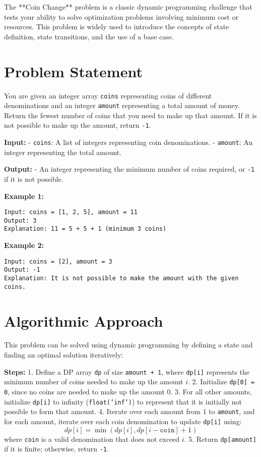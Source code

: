 
\label{problem:Coin_Change}

The **Coin Change** problem is a classic dynamic programming challenge that tests your ability to solve optimization problems involving minimum cost or resources. This problem is widely used to introduce the concepts of state definition, state transitions, and the use of a base case.

\section*{Problem Statement}
You are given an integer array \texttt{coins} representing coins of different denominations and an integer \texttt{amount} representing a total amount of money. Return the fewest number of coins that you need to make up that amount. If it is not possible to make up the amount, return \texttt{-1}.

\textbf{Input:}
- \texttt{coins}: A list of integers representing coin denominations.
- \texttt{amount}: An integer representing the total amount.

\textbf{Output:}
- An integer representing the minimum number of coins required, or \texttt{-1} if it is not possible.

\textbf{Example 1:}
\begin{verbatim}
Input: coins = [1, 2, 5], amount = 11
Output: 3
Explanation: 11 = 5 + 5 + 1 (minimum 3 coins)
\end{verbatim}

\textbf{Example 2:}
\begin{verbatim}
Input: coins = [2], amount = 3
Output: -1
Explanation: It is not possible to make the amount with the given coins.
\end{verbatim}

\section*{Algorithmic Approach}
This problem can be solved using dynamic programming by defining a state and finding an optimal solution iteratively:

\textbf{Steps:}
1. Define a DP array \texttt{dp} of size \texttt{amount + 1}, where \texttt{dp[i]} represents the minimum number of coins needed to make up the amount \( i \).
2. Initialize \texttt{dp[0] = 0}, since no coins are needed to make up the amount 0.
3. For all other amounts, initialize \texttt{dp[i]} to infinity (\texttt{float('inf')}) to represent that it is initially not possible to form that amount.
4. Iterate over each amount from \( 1 \) to \texttt{amount}, and for each amount, iterate over each coin denomination to update \texttt{dp[i]} using:
   \[
   dp[i] = \min(dp[i], dp[i - \texttt{coin}] + 1)
   \]
   where \texttt{coin} is a valid denomination that does not exceed \( i \).
5. Return \texttt{dp[amount]} if it is finite; otherwise, return \texttt{-1}.

